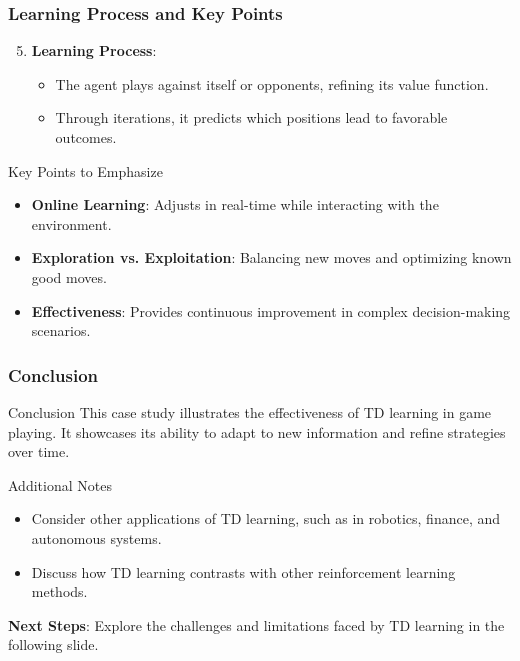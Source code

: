 \documentclass[aspectratio=169]{beamer}
\begin{document}
\begin{frame}[fragile]
    \frametitle{Learning Process and Key Points}
    \begin{enumerate}
        \setcounter{enumi}{4}
        \item \textbf{Learning Process}:
            \begin{itemize}
                \item The agent plays against itself or opponents, refining its value function.
                \item Through iterations, it predicts which positions lead to favorable outcomes.
            \end{itemize}
    \end{enumerate}

    \begin{block}{Key Points to Emphasize}
        \begin{itemize}
            \item \textbf{Online Learning}: Adjusts in real-time while interacting with the environment.
            \item \textbf{Exploration vs. Exploitation}: Balancing new moves and optimizing known good moves.
            \item \textbf{Effectiveness}: Provides continuous improvement in complex decision-making scenarios.
        \end{itemize}
    \end{block}
\end{frame}

\begin{frame}[fragile]
    \frametitle{Conclusion}
    \begin{block}{Conclusion}
        This case study illustrates the effectiveness of TD learning in game playing. It showcases its ability to adapt to new information and refine strategies over time.
    \end{block}

    \begin{block}{Additional Notes}
        \begin{itemize}
            \item Consider other applications of TD learning, such as in robotics, finance, and autonomous systems.
            \item Discuss how TD learning contrasts with other reinforcement learning methods.
        \end{itemize}
    \end{block}

    \textbf{Next Steps}: Explore the challenges and limitations faced by TD learning in the following slide.
\end{frame}
\end{document}
